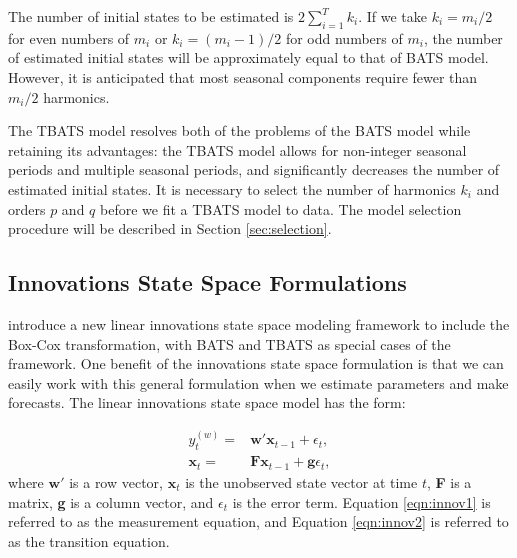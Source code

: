 \documentclass{uwstat572}
\begin{document}
The number of initial states to be estimated is $2\sum\limits_{i=1}^T k_i$. If we take $k_i=m_i/2$ for even numbers of $m_i$ or $k_i=(m_i-1)/2$ for odd numbers of $m_i$, the number of estimated initial states will be approximately equal to that of BATS model. However, it is anticipated that most seasonal components require fewer than $m_i/2$ harmonics. 

The TBATS model resolves both of the problems of the BATS model while retaining its advantages: the TBATS model allows for non-integer seasonal periods and multiple seasonal periods, and significantly decreases the number of estimated initial states. It is necessary to select the number of harmonics $k_i$ and orders $p$ and $q$ before we fit a TBATS model to data. The model selection procedure will be described in Section \ref{sec:selection}.

\subsection{Innovations State Space Formulations}
\hspace{4ex}\citet{de2011forecasting} introduce a new linear innovations state space modeling framework to include the Box-Cox transformation, with BATS and TBATS as special cases of the framework. One benefit of the innovations state space formulation is that we can easily work with this general formulation when we estimate parameters and make forecasts. The linear innovations state space model has the form:

\begin{subequations}
\begin{align}
y_t^{  (w)}=&\textbf{w}'\textbf{x}_{t-1}+\epsilon_t, \label{eqn:innov1}\\
\textbf{x}_t=&\textbf{Fx}_{t-1}+\textbf{g}\epsilon_t, \label{eqn:innov2}
\end{align}
\end{subequations}
\noindent where $\textbf{w}'$ is a row vector, $\textbf{x}_t$ is the unobserved state vector at time $t$, \textbf{F} is a matrix, \textbf{g} is a column vector, and $\epsilon_t$ is the error term. Equation \ref{eqn:innov1} is referred to as the measurement equation, and Equation \ref{eqn:innov2} is referred to as the transition equation.
\end{document}
